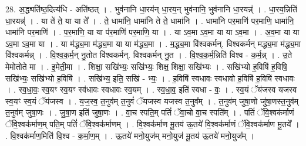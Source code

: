 \documentclass[17pt]{extarticle}
\begin{document}
28. अ॒द्ध्यति॑ष्ठ॒दित्य॑धि - अति॑ष्ठत् । . भुव॑नानि धा॒रय॑न् धा॒रय॒न् भुव॑नानि॒ भुव॑नानि धा॒रयन्न्॑ । . धा॒रय॒न्निति॑ धा॒रयन्न्॑ । . या ते॑ ते॒ या या ते᳚ । . ते॒ धामा॑नि॒ धामा॑नि ते ते॒ धामा॑नि । . धामा॑नि पर॒माणि॑ पर॒माणि॒ धामा॑नि॒ धामा॑नि पर॒माणि॑ । . प॒र॒माणि॒ या या प॑र॒माणि॑ पर॒माणि॒ या । . या ऽव॒मा ऽव॒मा या या ऽव॒मा । . अ॒व॒मा या या ऽव॒मा ऽव॒मा या । . या म॑द्ध्य॒मा म॑द्ध्य॒मा या या म॑द्ध्य॒मा । . म॒द्ध्य॒मा वि॑श्वकर्मन्. विश्वकर्मन् मद्ध्य॒मा म॑द्ध्य॒मा वि॑श्वकर्मन्न् । . वि॒श्व॒क॒र्म॒न् नु॒तोत वि॑श्वकर्मन्. विश्वकर्मन् नु॒त । . वि॒श्व॒क॒र्म॒न्निति॑ विश्व - क॒र्म॒न्न् । . उ॒ते मेमोतोते मा । . इ॒मेती॒मा । . शिक्षा॒ सखि॑भ्यः॒ सखि॑भ्यः॒ शिक्ष॒ शिक्षा॒ सखि॑भ्यः । . सखि॑भ्यो ह॒विषि॑ ह॒विषि॒ सखि॑भ्यः॒ सखि॑भ्यो ह॒विषि॑ । . सखि॑भ्य॒ इति॒ सखि॑ - भ्यः॒ । . ह॒विषि॑ स्वधावः स्वधावो ह॒विषि॑ ह॒विषि॑ स्वधावः । . स्व॒धा॒वः॒ स्व॒यꣳ स्व॒यꣳ स्व॑धावः स्वधावः स्व॒यम् । . स्व॒धा॒व॒ इति॑ स्वधा - वः॒ । . स्व॒यं ॅय॑जस्व यजस्व स्व॒यꣳ स्व॒यं ॅय॑जस्व । . य॒ज॒स्व॒ त॒नुव॑म् त॒नुवं॑ ॅयजस्व यजस्व त॒नुव᳚म् । . त॒नुव॑म् जुषा॒णो जु॑षा॒णस्त॒नुव॑म् त॒नुव॑म् जुषा॒णः । . जु॒षा॒ण इति॑ जुषा॒णः । . वा॒च स्पति॒म् पतिं॑ ॅवा॒चो वा॒च स्पति᳚म् । . पतिं॑ ॅवि॒श्वक॑र्माणं ॅवि॒श्वक॑र्माण॒म् पति॒म् पतिं॑ ॅवि॒श्वक॑र्माणम् । . वि॒श्वक॑र्माण मू॒तय॑ ऊ॒तये॑ वि॒श्वक॑र्माणं ॅवि॒श्वक॑र्माण मू॒तये᳚ । . वि॒श्वक॑र्माण॒मिति॑ वि॒श्व - क॒र्मा॒ण॒म् । . ऊ॒तये॑ मनो॒युज॑म् मनो॒युज॑ मू॒तय॑ ऊ॒तये॑ मनो॒युज᳚म् । \newline
\end{document}
